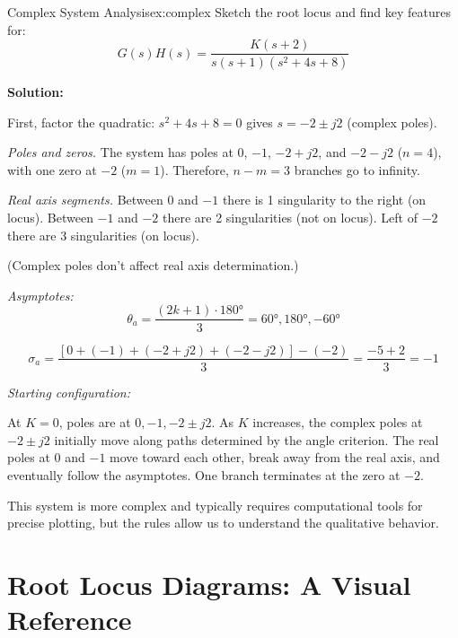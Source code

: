 \begin{example}{Complex System Analysis}{ex:complex}
Sketch the root locus and find key features for:
\[
G(s)H(s) = \frac{K(s+2)}{s(s+1)(s^2+4s+8)}
\]

\textbf{Solution:}

First, factor the quadratic: $s^2 + 4s + 8 = 0$ gives $s = -2 \pm j2$ (complex poles).

\textit{Poles and zeros.} The system has poles at $0$, $-1$, $-2+j2$, and $-2-j2$ ($n = 4$), with one zero at $-2$ ($m = 1$). Therefore, $n - m = 3$ branches go to infinity.

\textit{Real axis segments.} Between $0$ and $-1$ there is 1 singularity to the right (on locus). Between $-1$ and $-2$ there are 2 singularities (not on locus). Left of $-2$ there are 3 singularities (on locus).

(Complex poles don't affect real axis determination.)

\textit{Asymptotes:}
\[
\theta_a = \frac{(2k+1) \cdot 180°}{3} = 60°, 180°, -60°
\]

\[
\sigma_a = \frac{[0 + (-1) + (-2+j2) + (-2-j2)] - (-2)}{3} = \frac{-5 + 2}{3} = -1
\]

\textit{Starting configuration:}

At $K = 0$, poles are at $0, -1, -2 \pm j2$. As $K$ increases, the complex poles at $-2 \pm j2$ initially move along paths determined by the angle criterion. The real poles at $0$ and $-1$ move toward each other, break away from the real axis, and eventually follow the asymptotes. One branch terminates at the zero at $-2$.

This system is more complex and typically requires computational tools for precise plotting, but the rules allow us to understand the qualitative behavior.
\end{example}

\section{Root Locus Diagrams: A Visual Reference}
\label{sec:diagrams}

